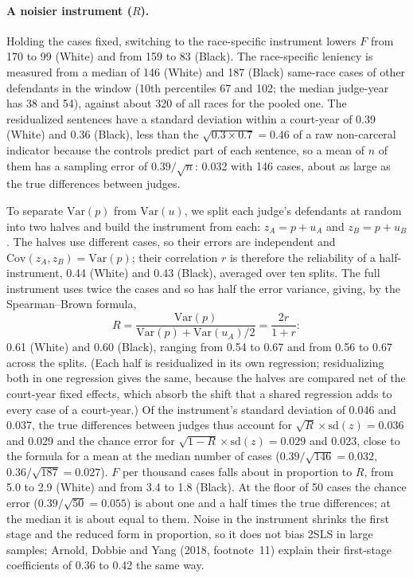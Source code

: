 \documentclass[11pt]{article}
\begin{document}
\paragraph{A noisier instrument ($R$).} Holding the cases fixed, switching to the race-specific instrument lowers $F$ from 170 to 99 (White) and from 159 to 83 (Black). The race-specific leniency is measured from a median of 146 (White) and 187 (Black) same-race cases of other defendants in the window (10th percentiles 67 and 102; the median judge-year has 38 and 54), against about 320 of all races for the pooled one. The residualized sentences have a standard deviation within a court-year of 0.39 (White) and 0.36 (Black), less than the $\sqrt{0.3 \times 0.7} = 0.46$ of a raw non-carceral indicator because the controls predict part of each sentence, so a mean of $n$ of them has a sampling error of $0.39/\sqrt{n}$: 0.032 with 146 cases, about as large as the true differences between judges.

To separate $\mathrm{Var}(p)$ from $\mathrm{Var}(u)$, we split each judge's defendants at random into two halves and build the instrument from each: $z_A = p + u_A$ and $z_B = p + u_B$. The halves use different cases, so their errors are independent and $\mathrm{Cov}(z_A, z_B) = \mathrm{Var}(p)$; their correlation $r$ is therefore the reliability of a half-instrument, 0.44 (White) and 0.43 (Black), averaged over ten splits. The full instrument uses twice the cases and so has half the error variance, giving, by the Spearman--Brown formula,
\begin{equation*}
R = \frac{\mathrm{Var}(p)}{\mathrm{Var}(p) + \mathrm{Var}(u_A)/2} = \frac{2r}{1 + r}:
\end{equation*}
0.61 (White) and 0.60 (Black), ranging from 0.54 to 0.67 and from 0.56 to 0.67 across the splits. (Each half is residualized in its own regression; residualizing both in one regression gives the same, because the halves are compared net of the court-year fixed effects, which absorb the shift that a shared regression adds to every case of a court-year.) Of the instrument's standard deviation of 0.046 and 0.037, the true differences between judges thus account for $\sqrt{R} \times \mathrm{sd}(z) = 0.036$ and 0.029 and the chance error for $\sqrt{1-R} \times \mathrm{sd}(z) = 0.029$ and 0.023, close to the formula for a mean at the median number of cases ($0.39/\sqrt{146} = 0.032$, $0.36/\sqrt{187} = 0.027$). $F$ per thousand cases falls about in proportion to $R$, from 5.0 to 2.9 (White) and from 3.4 to 1.8 (Black). At the floor of 50 cases the chance error ($0.39/\sqrt{50} = 0.055$) is about one and a half times the true differences; at the median it is about equal to them. Noise in the instrument shrinks the first stage and the reduced form in proportion, so it does not bias 2SLS in large samples; Arnold, Dobbie and Yang (2018, footnote~11) explain their first-stage coefficients of 0.36 to 0.42 the same way.
\end{document}
